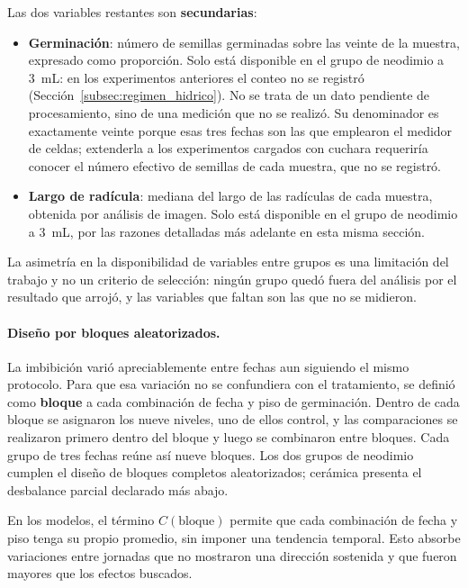 Las dos variables restantes son \textbf{secundarias}:

\begin{itemize}
    \item \textbf{Germinación}: número de semillas germinadas sobre las veinte de la muestra, expresado como proporción. Solo está disponible en el grupo de neodimio a 3~mL: en los experimentos anteriores el conteo no se registró (Sección~\ref{subsec:regimen_hidrico}). No se trata de un dato pendiente de procesamiento, sino de una medición que no se realizó. Su denominador es exactamente veinte porque esas tres fechas son las que emplearon el medidor de celdas; extenderla a los experimentos cargados con cuchara requeriría conocer el número efectivo de semillas de cada muestra, que no se registró.
    \item \textbf{Largo de radícula}: mediana del largo de las radículas de cada muestra, obtenida por análisis de imagen. Solo está disponible en el grupo de neodimio a 3~mL, por las razones detalladas más adelante en esta misma sección.
\end{itemize}

La asimetría en la disponibilidad de variables entre grupos es una limitación del trabajo y no un criterio de selección: ningún grupo quedó fuera del análisis por el resultado que arrojó, y las variables que faltan son las que no se midieron.

\paragraph{Diseño por bloques aleatorizados.}\leavevmode\par

\begin{interpretacionfisica}
\titulointerpretacion
La imbibición varió apreciablemente entre fechas aun siguiendo el mismo protocolo. Para que esa variación no se confundiera con el tratamiento, se definió como \textbf{bloque} a cada combinación de fecha y piso de germinación. Dentro de cada bloque se asignaron los nueve niveles, uno de ellos control, y las comparaciones se realizaron primero dentro del bloque y luego se combinaron entre bloques. Cada grupo de tres fechas reúne así nueve bloques. Los dos grupos de neodimio cumplen el diseño de bloques completos aleatorizados; cerámica presenta el desbalance parcial declarado más abajo.
\end{interpretacionfisica}

En los modelos, el término \(C(\text{bloque})\) permite que cada combinación de fecha y piso tenga su propio promedio, sin imponer una tendencia temporal. Esto absorbe variaciones entre jornadas que no mostraron una dirección sostenida y que fueron mayores que los efectos buscados.

